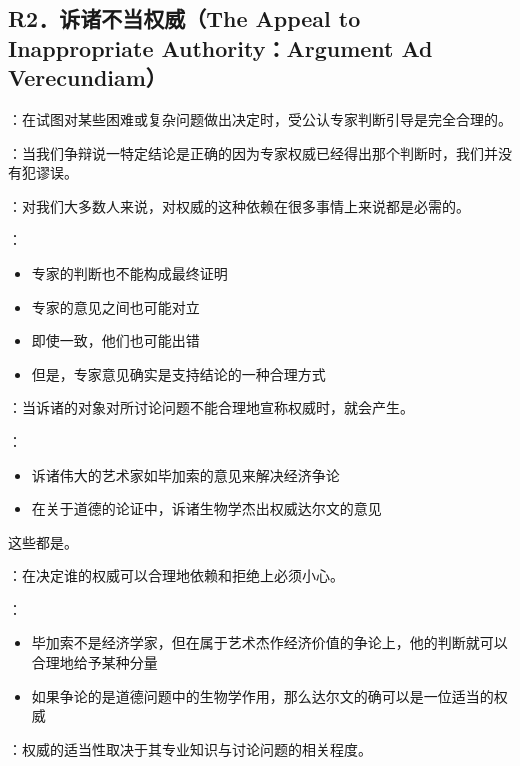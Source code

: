 \subsection{R2．诉诸不当权威（The Appeal to Inappropriate Authority：Argument Ad Verecundiam）}

\begin{theorembox}[title=权威诉诸的合理性]
：在试图对某些困难或复杂问题做出决定时，受公认专家判断引导是完全合理的。

：当我们争辩说一特定结论是正确的因为专家权威已经得出那个判断时，我们并没有犯谬误。

：对我们大多数人来说，对权威的这种依赖在很多事情上来说都是必需的。

：
\begin{itemize}
  \item 专家的判断也不能构成最终证明
  \item 专家的意见之间也可能对立
  \item 即使一致，他们也可能出错
  \item 但是，专家意见确实是支持结论的一种合理方式
\end{itemize}
\end{theorembox}

\begin{theorembox}[title=诉诸不当权威谬误的定义]
：当诉诸的对象对所讨论问题不能合理地宣称权威时，就会产生。

：
\begin{itemize}
  \item 诉诸伟大的艺术家如毕加索的意见来解决经济争论
  \item 在关于道德的论证中，诉诸生物学杰出权威达尔文的意见
\end{itemize}

这些都是。
\end{theorembox}

\begin{theorembox}[title=权威判断的复杂性]
：在决定谁的权威可以合理地依赖和拒绝上必须小心。

：
\begin{itemize}
  \item 毕加索不是经济学家，但在属于艺术杰作经济价值的争论上，他的判断就可以合理地给予某种分量
  \item 如果争论的是道德问题中的生物学作用，那么达尔文的确可以是一位适当的权威
\end{itemize}

：权威的适当性取决于其专业知识与讨论问题的相关程度。
\end{theorembox}

